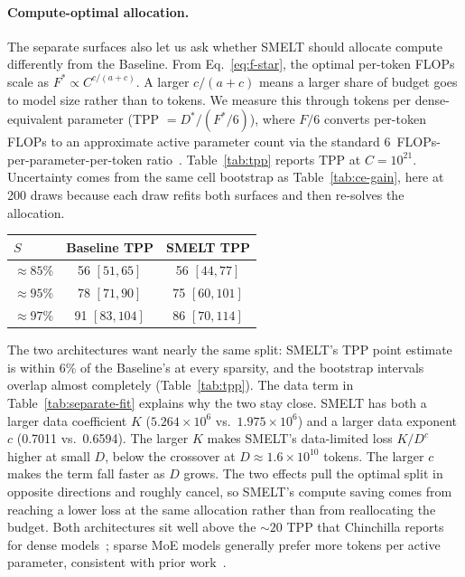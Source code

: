 \documentclass[]{bytedance_seed}
\newcommand{\archname}{SMELT}
\theoremstyle{definition}
\theoremstyle{remark}
\begin{document}
\paragraph{Compute-optimal allocation.}
%
The separate surfaces also let us ask whether \archname{} should allocate compute differently from the Baseline.
%
From Eq.~\ref{eq:f-star}, the optimal per-token FLOPs scale as $F^{*} \propto C^{c/(a+c)}$.
%
A larger $c/(a+c)$ means a larger share of budget goes to model size rather than to tokens.
%
We measure this through tokens per dense-equivalent parameter (TPP $= D^{*} / (F^{*}/6)$), where $F/6$ converts per-token FLOPs to an approximate active parameter count via the standard $6$~FLOPs-per-parameter-per-token ratio~\cite{kaplan2020scaling}.
%
Table~\ref{tab:tpp} reports TPP at $C = 10^{21}$.
%
Uncertainty comes from the same cell bootstrap as Table~\ref{tab:ce-gain}, here at 200 draws because each draw refits both surfaces and then re-solves the allocation.
%

\begin{center}
\begin{minipage}{\linewidth}
\small
{}
\label{tab:tpp}
\centering
\begin{tabular}{lcc}
\toprule
$S$ & Baseline TPP & \archname{} TPP \\
\midrule
$\approx85\%$ & 56 $[51, 65]$ & 56 $[44, 77]$ \\
$\approx95\%$ & 78 $[71, 90]$ & 75 $[60, 101]$ \\
$\approx97\%$ & 91 $[83, 104]$ & 86 $[70, 114]$ \\
\bottomrule
\end{tabular}
\end{minipage}
\end{center}

The two architectures want nearly the same split: \archname{}'s TPP point estimate is within 6\% of the Baseline's at every sparsity, and the bootstrap intervals overlap almost completely (Table~\ref{tab:tpp}).
%
The data term in Table~\ref{tab:separate-fit} explains why the two stay close.
%
\archname{} has both a larger data coefficient $K$ ($5.264 \times 10^{6}$ vs.\ $1.975 \times 10^{6}$) and a larger data exponent $c$ (0.7011 vs.\ 0.6594).
%
The larger $K$ makes \archname{}'s data-limited loss $K/D^c$ higher at small
$D$, below the crossover at $D \approx 1.6 \times 10^{10}$ tokens.
%
The larger $c$ makes the term fall faster as $D$ grows.
%
The two effects pull the optimal split in opposite directions and roughly cancel, so \archname{}'s compute saving comes from reaching a lower loss at the same allocation rather than from reallocating the budget.
%
Both architectures sit well above the ${\sim}20$ TPP that Chinchilla reports for dense models~\cite{hoffmann2022training}; sparse MoE models generally prefer more tokens per active parameter, consistent with prior work~\cite{abnar2025parameters}.
%
\end{document}
